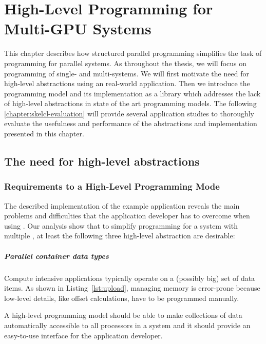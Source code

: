 
\chapter{High-Level Programming for Multi-GPU Systems}

\label{chapter:skelcl}

This chapter describes how structured parallel programming simplifies the task of programming for parallel systems.
As throughout the thesis, we will focus on programming of single- and multi-\GPU systems.
We will first motivate the need for high-level abstractions using an real-world \OpenCL application.
Then we introduce the \emph{\SkelCL} programming model and its implementation as a \Cpp library which addresses the lack of high-level abstractions in state of the art \GPU programming models.
The following \autoref{chapter:skelcl-evaluation} will provide several application studies to thoroughly evaluate the usefulness and performance of the abstractions and implementation presented in this chapter.

\section{The need for high-level abstractions}

\subsection{Requirements to a High-Level Programming Mode}
The described implementation of the example application reveals the main problems and difficulties that the application developer has to overcome when using \OpenCL.
Our analysis show that to simplify programming for a system with multiple \GPUs, at least the following three high-level abstraction are desirable:

\paragraph{Parallel container data types}
Compute intensive applications typically operate on a (possibly big) set of data items.
As shown in Listing~\ref{lst:upload}, managing memory is error-prone because low-level details, like offset calculations, have to be programmed manually.

A high-level programming model should be able to make collections of data automatically accessible to all processors in a system and it should provide an easy-to-use interface for the application developer.

